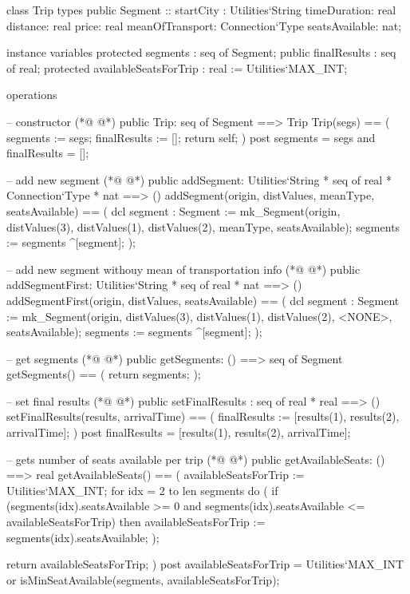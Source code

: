 \begin{vdmpp}[breaklines=true]
class Trip
types
 public Segment :: startCity : Utilities`String
           timeDuration: real
           distance: real
           price: real
           meanOfTransport: Connection`Type
           seatsAvailable: nat;

instance variables
 protected segments : seq of Segment;
 public finalResults : seq of real;
 protected availableSeatsForTrip : real := Utilities`MAX_INT;
  
operations
 
 -- constructor
(*@
\label{Trip:18}
@*)
 public Trip: seq of Segment ==> Trip
 Trip(segs) ==
 (
  segments := segs;
  finalResults := [];
  return self;
 )
 post segments = segs and finalResults = [];
 
 -- add new segment
(*@
\label{addSegment:28}
@*)
 public addSegment: Utilities`String * seq of real * Connection`Type * nat ==> ()
 addSegment(origin, distValues, meanType, seatsAvailable) ==
 (
  dcl segment : Segment := mk_Segment(origin, distValues(3), distValues(1), distValues(2), meanType, seatsAvailable);
  segments := segments ^[segment]; 
 );
 
 -- add new segment withouy mean of transportation info
(*@
\label{addSegmentFirst:36}
@*)
 public addSegmentFirst: Utilities`String * seq of real  * nat ==> ()
 addSegmentFirst(origin, distValues, seatsAvailable) ==
 (
  dcl segment : Segment := mk_Segment(origin, distValues(3), distValues(1), distValues(2), <NONE>, seatsAvailable);
  segments := segments ^[segment]; 
 );
 
 -- get segments
(*@
\label{getSegments:44}
@*)
 public getSegments: () ==> seq of Segment
 getSegments() ==
 (
  return segments;
 );
 
 -- set final results
(*@
\label{setFinalResults:51}
@*)
 public setFinalResults : seq of real * real ==> ()
 setFinalResults(results, arrivalTime) ==
 (
  finalResults := [results(1), results(2), arrivalTime];
 )
 post finalResults = [results(1), results(2), arrivalTime];
 
 -- gets number of seats available per trip
(*@
\label{getAvailableSeats:59}
@*)
 public getAvailableSeats: () ==> real
 getAvailableSeats() ==
 (
   availableSeatsForTrip := Utilities`MAX_INT;
  for idx = 2 to len segments do (
   if (segments(idx).seatsAvailable >= 0 and segments(idx).seatsAvailable <= availableSeatsForTrip) then
    availableSeatsForTrip := segments(idx).seatsAvailable;
  );
   
  return availableSeatsForTrip;
 )
 post availableSeatsForTrip = Utilities`MAX_INT or isMinSeatAvailable(segments, availableSeatsForTrip);
 

\end{vdmpp}
